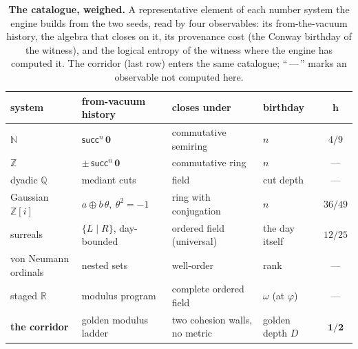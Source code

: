 \documentclass[11pt,letterpaper]{article}
\theoremstyle{plain}
\theoremstyle{definition}
\theoremstyle{remark}
\newcommand{\NN}{\mathbb{N}}
\newcommand{\ZZ}{\mathbb{Z}}
\newcommand{\QQ}{\mathbb{Q}}
\newcommand{\RR}{\mathbb{R}}
\newcommand{\Llog}{h}                                   %
\begin{document}
\begin{table}[t]
\centering
\caption{\textbf{The catalogue, weighed.} A representative element of each number
system the engine builds from the two seeds, read by four observables: its
from-the-vacuum history, the algebra that closes on it, its provenance cost (the Conway
birthday of the witness), and the logical entropy of the witness where the engine
has computed it. The corridor (last row) enters the same catalogue; ``\,---\,''
marks an observable not computed here.}
\label{tab:catalogue}
\small
\begin{tabular}{@{}llllc@{}}
\toprule
\textbf{system} & \textbf{from-vacuum history} & \textbf{closes under} & \textbf{birthday} & $\bm{\Llog}$ \\
\midrule
$\NN$                  & $\mathsf{succ}^{n}\,\mathbf 0$            & commutative semiring          & $n$              & $4/9$ \\
$\ZZ$                  & $\pm\,\mathsf{succ}^{n}\,\mathbf 0$       & commutative ring              & $n$              & --- \\
dyadic $\QQ$           & mediant cuts                              & field                         & cut depth        & --- \\
Gaussian $\ZZ[i]$      & $a \oplus b\,\theta,\ \theta^{2}{=}{-}1$  & ring with conjugation         & $n$              & $36/49$ \\
surreals               & $\{L \mid R\}$, day-bounded               & ordered field (universal)     & the day itself   & $12/25$ \\
von Neumann ordinals   & nested sets                               & well-order                    & rank             & --- \\
staged $\RR$           & modulus program                           & complete ordered field        & $\omega$ (at $\varphi$) & --- \\
\midrule
\textbf{the corridor}  & golden modulus ladder                     & two cohesion walls, no metric & golden depth $D$ & $\bm{1/2}$ \\
\bottomrule
\end{tabular}
\end{table}
\end{document}
